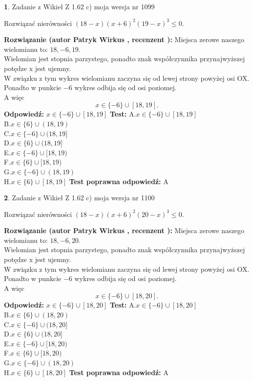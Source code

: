 \documentclass[12pt, a4paper]{article}
\theoremstyle{definition} %
\newtheorem{zad}{}
\newcommand{\zadStart}[1]{\begin{zad}#1\newline}
\newcommand{\zadStop}{\end{zad}}
\newcommand{\rozwStart}[2]{\noindent \textbf{Rozwiązanie (autor #1 , recenzent #2): }\newline}
\newcommand{\rozwStop}{\newline}
\newcommand{\odpStart}{\noindent \textbf{Odpowiedź:}\newline}
\newcommand{\odpStop}{\newline}
\newcommand{\testStart}{\noindent \textbf{Test:}\newline}
\newcommand{\testStop}{\newline}
\newcommand{\kluczStart}{\noindent \textbf{Test poprawna odpowiedź:}\newline}
\newcommand{\kluczStop}{\newline}
\begin{document}
\zadStart{Zadanie z Wikieł Z 1.62 c) moja wersja nr 1099}

Rozwiązać nierówności $(18-x)(x+6)^{2}(19-x)^{3}\le0$.
\zadStop
\rozwStart{Patryk Wirkus}{}
Miejsca zerowe naszego wielomianu to: $18, -6, 19$.\\
Wielomian jest stopnia parzystego, ponadto znak współczynnika przy\linebreak najwyższej potędze x jest ujemny.\\ W związku z tym wykres wielomianu zaczyna się od lewej strony powyżej osi OX.\\
Ponadto w punkcie $-6$ wykres odbija się od osi poziomej.\\
A więc $$x \in \{-6\} \cup [18,19].$$
\rozwStop
\odpStart
$x \in \{-6\} \cup [18,19]$
\odpStop
\testStart
A.$x \in \{-6\} \cup [18,19]$\\
B.$x \in \{6\} \cup (18,19)$\\
C.$x \in \{-6\} \cup (18,19]$\\
D.$x \in \{6\} \cup (18,19]$\\
E.$x \in \{-6\} \cup [18,19)$\\
F.$x \in \{6\} \cup [18,19)$\\
G.$x \in \{-6\} \cup (18,19)$\\
H.$x \in \{6\} \cup [18,19]$
\testStop
\kluczStart
A
\kluczStop



\zadStart{Zadanie z Wikieł Z 1.62 c) moja wersja nr 1100}

Rozwiązać nierówności $(18-x)(x+6)^{2}(20-x)^{3}\le0$.
\zadStop
\rozwStart{Patryk Wirkus}{}
Miejsca zerowe naszego wielomianu to: $18, -6, 20$.\\
Wielomian jest stopnia parzystego, ponadto znak współczynnika przy\linebreak najwyższej potędze x jest ujemny.\\ W związku z tym wykres wielomianu zaczyna się od lewej strony powyżej osi OX.\\
Ponadto w punkcie $-6$ wykres odbija się od osi poziomej.\\
A więc $$x \in \{-6\} \cup [18,20].$$
\rozwStop
\odpStart
$x \in \{-6\} \cup [18,20]$
\odpStop
\testStart
A.$x \in \{-6\} \cup [18,20]$\\
B.$x \in \{6\} \cup (18,20)$\\
C.$x \in \{-6\} \cup (18,20]$\\
D.$x \in \{6\} \cup (18,20]$\\
E.$x \in \{-6\} \cup [18,20)$\\
F.$x \in \{6\} \cup [18,20)$\\
G.$x \in \{-6\} \cup (18,20)$\\
H.$x \in \{6\} \cup [18,20]$
\testStop
\kluczStart
A
\kluczStop
\end{document}
